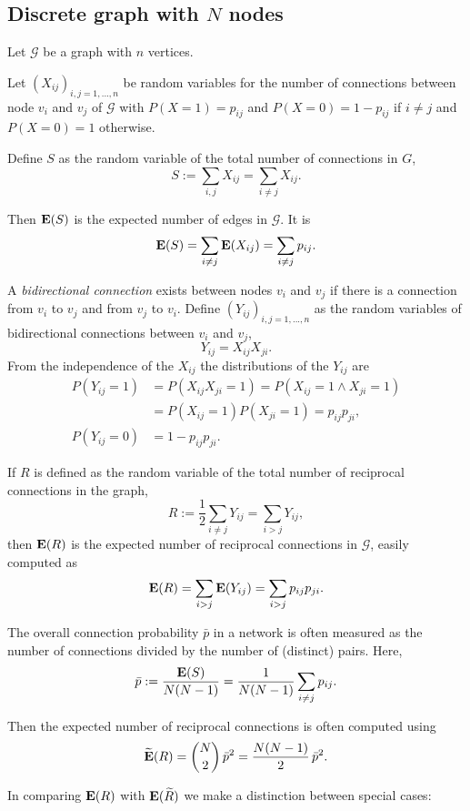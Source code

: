 \subsection{Discrete graph with $N$ nodes}

Let $\mathcal{G}$ be a graph with $n$ vertices.

Let $(X_{ij})_{i,j=1,...,n}$ be random variables for the number of connections between node $v_i$ and $v_j$ of $\mathcal{G}$ with $P(X=1)=p_{ij}$ and $P(X=0)=1-p_{ij}$ if $i \neq j$ and $P(X=0) =1 $ otherwise.

Define $S$ as the random variable of the total number of connections in $G$,
\[
S := \sum_{i,j} X_{ij} = \sum_{i \neq j} X_{ij}.
\]

Then $\operatorname{\mathbf{E}}(S)$ is the expected number of edges in $\mathcal{G}$. It is
\[
\operatorname{\mathbf{E}}(S) = \sum_{i \neq j} \operatorname{\mathbf{E}}(X_{ij}) = \sum_{i \neq j} p_{ij}.
\]

A \emph{bidirectional connection} exists between nodes $v_i$ and $v_j$ if there is a connection from $v_i$ to $v_j$ and from $v_j$ to $v_i$. Define  $(Y_{ij})_{i,j=1,...,n}$ as the random variables of bidirectional connections between $v_i$ and $v_j$,
\[
Y_{ij} = X_{ij} X_{ji}.
\]
From the independence of the $X_{ij}$ the distributions of the $Y_{ij}$ are
\begin{align*}
  P(Y_{ij} = 1) &= P(X_{ij}X_{ji}=1) = P(X_{ij} =1 \wedge X_{ji}=1) \\ &=  P(X_{ij}=1) P(X_{ji}=1) = p_{ij} p_{ji}, \\ P(Y_{ij} = 0) &= 1 - p_{ij}p_{ji}.
  \end{align*}

If $R$ is defined as the random variable of the total number of reciprocal connections in the graph,
\[
R := \frac{1}{2} \sum_{i \neq j} Y_{ij} = \sum_{i > j} Y_{ij},
\]
then $\operatorname{\mathbf{E}}(R)$ is the expected number of reciprocal connections in $\mathcal{G}$, easily computed as
\[
\operatorname{\mathbf{E}}(R) = \sum_{i>j} \operatorname{\mathbf{E}}(Y_{ij}) = \sum_{i > j} p_{ij} p_{ji}.
\]

The overall connection probability $\bar{p}$ in a network is often measured as the number of connections divided by the number of (distinct) pairs. Here,
\[
\bar{p} := \frac{\operatorname{\mathbf{E}}(S)}{N(N-1)} = \frac{1}{N(N-1)} \sum_{i \neq j} p_{ij}.
\]

Then the expected number of reciprocal connections is often computed using
\[
\widetilde{\operatorname{\mathbf{E}}}(R) = \binom{N}{2}\, \bar{p}^2 = \frac{N(N-1)}{2}\,  \bar{p}^2.
\]

In comparing $\operatorname{\mathbf{E}}(R)$ with $\operatorname{\mathbf{E}}(\widetilde{R})$ we make a distinction between special cases:

